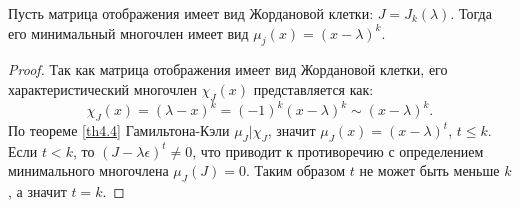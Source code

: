 \begin{proposition}
    Пусть матрица отображения имеет вид Жордановой клетки: $J = J_k(\lambda)$. 
    Тогда его минимальный многочлен имеет вид $\mu_j(x) = (x - \lambda)^k$.
\end{proposition}

\begin{proof}
    Так как матрица отображения имеет вид Жордановой клетки, 
    его характеристический многочлен $\chi_J(x)$ представляется как:
    $$\chi_J(x) = (\lambda - x)^k = (-1)^k (x - \lambda)^k \sim (x - \lambda)^k.$$
    По теореме \ref{th4.4} Гамильтона-Кэли $\mu_J \vert \chi_J$, значит $\mu_J (x) = (x - \lambda)^t$, $t \leq k$.
    Если $t < k$, то $(J - \lambda \epsilon)^t \neq 0$, 
    что приводит к противоречию с определением минимального многочлена $\mu_J(J) = 0$.  
    Таким образом $t$ не может быть меньше $k$, а значит $t = k$. 
\end{proof}
